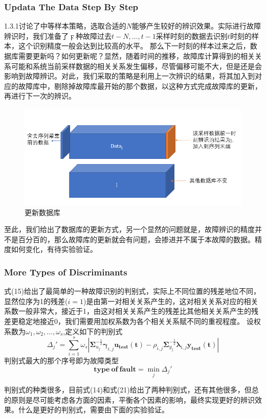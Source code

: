 \documentclass[lang=cn,11pt,a4paper]{elegantpaper}
\begin{document}
\subsubsection{Updata The Data Step By Step}
1.3.1讨论了中等样本策略，选取合适的$N$能够产生较好的辨识效果。实际进行故障辨识时，我们准备了$\digamma$种故障过去$t-N,\ldots,t-1$采样时刻的数据去识别$t$时刻的样本，这个识别精度一般会达到比较高的水平。
那么下一时刻的样本过来之后，数据库需要更新吗？如何更新呢？显然，随着时间的推移，故障库计算得到的相关关系可能和系统当前采样数据的相关关系发生偏移，尽管偏移可能不大，但是还是会影响到故障辨识。对此，我们采取的策略是利用上一次辨识的结果，将其加入到对应的故障库中，剔除掉故障库最开始的那个数据，以这种方式完成故障库的更新，再进行下一次的辨识。
\begin{figure}[H] %
	\centering %
	\includegraphics[width=1.0\textwidth]{figure4} %
	\caption{更新数据库} %
	\label{Fig.main3} %
\end{figure}
至此，我们给出了数据库的更新方式，另一个显然的问题就是，故障辨识的精度并不是百分百的，那么故障库的更新就会有问题，会掺进并不属于本故障的数据。精度如何变化，有待实验验证。
\subsubsection{
	More Types of Discriminants}
式(15)给出了最简单的一种故障识别的判别式，实际上不同位置的残差地位不同，显然位序为1的残差($i=1$)是由第一对相关关系产生的，这对相关关系对应的相关系数一般非常大，接近于1，由这对相关关系产生的残差比其他相关关系产生的残差更稳定地接近0，我们需要用加权系数为各个相关关系赋不同的重视程度。
设权系数为$\omega_1,\omega_2,\ldots,\omega_s$,定义如下的判别式
\begin{equation}
	\Delta_j' = \sum_{i=1}^{s}\omega_s\left|\boldsymbol{\Sigma}_{u_j}^{-\frac{1}{2}}\boldsymbol{\gamma}_{i,j}\boldsymbol{u_{test}(t)}-\rho_{i,j}\boldsymbol{\Sigma}_{y_j}^{-\frac{1}{2}}\boldsymbol{\lambda}_{i,j}\boldsymbol{y_{test}(t)}\right|
\end{equation}
判别式最大的那个序号即为故障类型
\begin{equation}
	\boldsymbol{type\ of \ fault} = \min \limits_{j} \Delta_j'
\end{equation}
\begin{shaded}
	判别式的种类很多，目前式(14)和式(21)给出了两种判别式，还有其他很多，但总的原则是尽可能考虑各方面的因素，平衡各个因素的影响，最终实现更好的辨识效果。什么是更好的判别式，需要由下面的实验验证。
\end{shaded}
\end{document}
